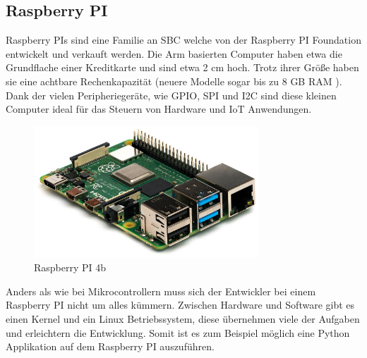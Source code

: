 ﻿\subsection{Raspberry PI}
\label{sec:raspberry_pi}

Raspberry PIs sind eine Familie an \ac{SBC} welche von der Raspberry PI Foundation entwickelt und verkauft werden. Die \ac{Arm} basierten Computer haben etwa die Grundflache einer Kreditkarte und sind etwa 2 cm hoch. Trotz ihrer Größe haben sie eine achtbare Rechenkapazität (neuere Modelle sogar bis zu 8 GB \ac{RAM} ). Dank der vielen Peripheriegeräte, wie \ac{GPIO}, \ac{SPI} und \ac{I2C} sind diese kleinen Computer ideal für das Steuern von Hardware und \ac{IoT} Anwendungen.

\begin{figure}[H]
  \centering
  \includegraphics[width=0.75\textwidth]{images/raspberry_pi_4b}
  \caption{Raspberry PI 4b }
  \label{fig:raspberry_pi_4b}
\end{figure}

Anders als wie bei Mikrocontrollern muss sich der Entwickler bei einem Raspberry PI nicht um alles kümmern. Zwischen Hardware und Software gibt es einen Kernel und ein Linux Betriebssystem, diese übernehmen viele der Aufgaben und erleichtern die Entwicklung. Somit ist es zum Beispiel möglich eine Python Applikation auf dem Raspberry PI auszuführen.


